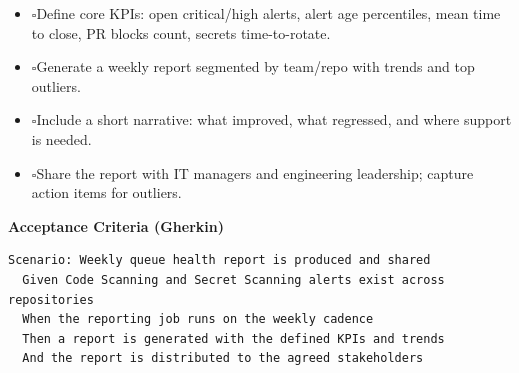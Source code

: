\documentclass[11pt,a4paper]{article}
\newcommand{\checkbox}{\(\square\)}
\let\cb\checkbox
\newenvironment{TasksBox}[1][Tasks]{%
  \begin{tcolorbox}[
    enhanced,breakable,
    colback=gray!1, colframe=gray!35,
    colbacktitle=gray!6, coltitle=black,
    title={#1}, fonttitle=\bfseries,
    borderline west={1.8pt}{0pt}{MidnightBlue},
    arc=2pt, boxrule=0.4pt,
    left=10pt,right=10pt,top=6pt,bottom=6pt,
    before skip=6pt, after skip=10pt
  ]
  \small
  \begin{itemize}[label=\cb, leftmargin=*, labelsep=0.6em, itemsep=4pt, topsep=2pt, parsep=0pt]
}{%
  \end{itemize}
  \end{tcolorbox}
}
\begin{document}
\begin{TasksBox}[Implementation Tasks]
  \item \cb Define core KPIs: open critical/high alerts, alert age percentiles, mean time to close, PR blocks count, secrets time-to-rotate.
  \item \cb Generate a weekly report segmented by team/repo with trends and top outliers.
  \item \cb Include a short narrative: what improved, what regressed, and where support is needed.
  \item \cb Share the report with IT managers and engineering leadership; capture action items for outliers.
\end{TasksBox}

\textbf{Acceptance Criteria (Gherkin)}
\begin{verbatim}
Scenario: Weekly queue health report is produced and shared
  Given Code Scanning and Secret Scanning alerts exist across repositories
  When the reporting job runs on the weekly cadence
  Then a report is generated with the defined KPIs and trends
  And the report is distributed to the agreed stakeholders
\end{verbatim}

\clearpage
\end{document}
